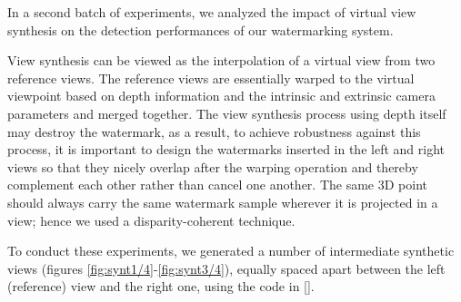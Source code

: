 In a second batch of experiments, we analyzed the impact of virtual view synthesis on the detection performances of our watermarking system.

View synthesis can be viewed as the interpolation of a virtual view from two reference views. The reference views are essentially warped to the virtual viewpoint based on depth information and the intrinsic and extrinsic camera parameters and merged together.\newline
The view synthesis process using depth itself may destroy the watermark, as a result, to achieve robustness against this process, it is important to design the watermarks inserted in the left and right views so that they nicely overlap after the warping operation and thereby complement each other rather than cancel one another. The same 3D point should always carry the same watermark sample wherever it is projected in a view; hence we used a disparity-coherent technique.

To conduct these experiments, we generated a number of intermediate synthetic views (figures \ref{fig:synt1/4}-\ref{fig:synt3/4}), equally spaced apart between the left (reference) view and the right one, using the code in [].\newline

